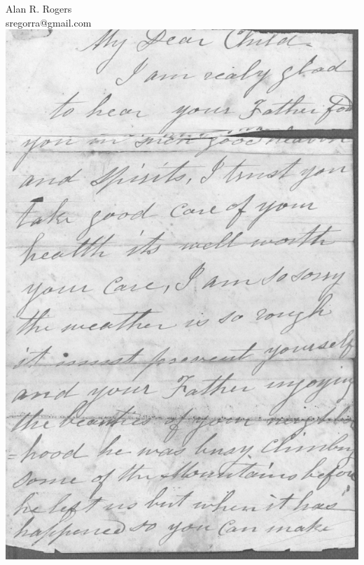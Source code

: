 \documentclass[12pt]{article}
\begin{document}
\bigskip

\mbox{}\hfill Alan R. Rogers\\
\mbox{}\hfill sregorra@gmail.com\\

\includegraphics[width=\textwidth]{MCarley1.pdf}
\end{document}
